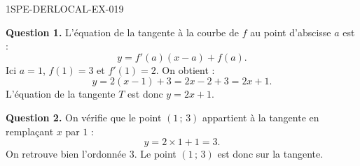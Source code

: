 \begin{corrige}{1SPE-DERLOCAL-EX-019}

\textbf{Question 1.} L'équation de la tangente à la courbe de $f$ au point d'abscisse $a$ est :
\[
y = f'(a)(x - a) + f(a).
\]
Ici $a = 1$, $f(1) = 3$ et $f'(1) = 2$. On obtient :
\[
y = 2(x - 1) + 3 = 2x - 2 + 3 = 2x + 1.
\]
L'équation de la tangente $T$ est donc $\boxed{y = 2x + 1}$.

\textbf{Question 2.} On vérifie que le point $(1\,;\,3)$ appartient à la tangente en remplaçant $x$ par $1$ :
\[
y = 2 \times 1 + 1 = 3.
\]
On retrouve bien l'ordonnée $3$. Le point $(1\,;\,3)$ est donc sur la tangente. \checkmark

\end{corrige}
